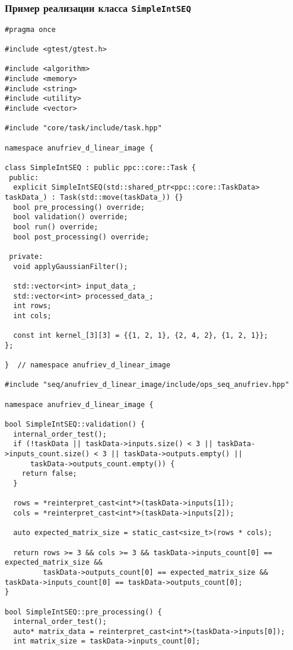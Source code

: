 \documentclass[12pt]{article}
\begin{document}
\subsubsection{Пример реализации класса \texttt{SimpleIntSEQ}}
\begin{lstlisting}
#pragma once

#include <gtest/gtest.h>

#include <algorithm>
#include <memory>
#include <string>
#include <utility>
#include <vector>

#include "core/task/include/task.hpp"

namespace anufriev_d_linear_image {

class SimpleIntSEQ : public ppc::core::Task {
 public:
  explicit SimpleIntSEQ(std::shared_ptr<ppc::core::TaskData> taskData_) : Task(std::move(taskData_)) {}
  bool pre_processing() override;
  bool validation() override;
  bool run() override;
  bool post_processing() override;

 private:
  void applyGaussianFilter();

  std::vector<int> input_data_;
  std::vector<int> processed_data_;
  int rows;
  int cols;

  const int kernel_[3][3] = {{1, 2, 1}, {2, 4, 2}, {1, 2, 1}};
};

}  // namespace anufriev_d_linear_image

#include "seq/anufriev_d_linear_image/include/ops_seq_anufriev.hpp"

namespace anufriev_d_linear_image {

bool SimpleIntSEQ::validation() {
  internal_order_test();
  if (!taskData || taskData->inputs.size() < 3 || taskData->inputs_count.size() < 3 || taskData->outputs.empty() ||
      taskData->outputs_count.empty()) {
    return false;
  }

  rows = *reinterpret_cast<int*>(taskData->inputs[1]);
  cols = *reinterpret_cast<int*>(taskData->inputs[2]);

  auto expected_matrix_size = static_cast<size_t>(rows * cols);

  return rows >= 3 && cols >= 3 && taskData->inputs_count[0] == expected_matrix_size &&
         taskData->outputs_count[0] == expected_matrix_size && taskData->inputs_count[0] == taskData->outputs_count[0];
}

bool SimpleIntSEQ::pre_processing() {
  internal_order_test();
  auto* matrix_data = reinterpret_cast<int*>(taskData->inputs[0]);
  int matrix_size = taskData->inputs_count[0];


\end{lstlisting}
\end{document}
